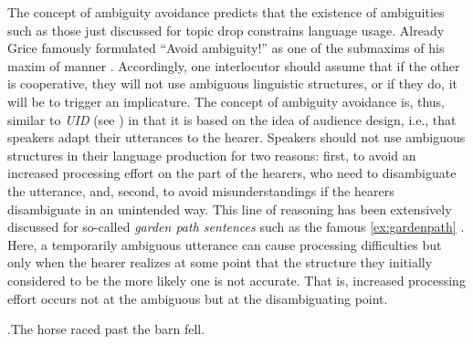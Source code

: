 The concept of ambiguity avoidance predicts that the existence of ambiguities  such as those just discussed for topic drop constrains language usage.
Already Grice famously formulated ``Avoid ambiguity!'' as one of the submaxims of his maxim of manner \citep[46]{grice1975}.
Accordingly, one interlocutor should assume that if the other is cooperative, they will not use ambiguous linguistic structures, or if they do, it will be to trigger an implicature.
The concept of ambiguity avoidance is, thus, similar to \textit{UID} (see ) in that it is based on the idea of audience design, i.e., that speakers adapt their utterances to the hearer.
Speakers should not use ambiguous structures in their language production for two reasons:  
first, to avoid an increased processing effort  on the part of the hearers, who need to disambiguate the utterance, and, second, to avoid misunderstandings if the hearers disambiguate in an unintended way.
This line of reasoning has been extensively discussed for so-called \textit{garden path sentences} such as the famous \ref{ex:gardenpath} \citep[see, e.g.,][]{sanz.etal2013}.
Here, a temporarily ambiguous utterance can cause processing difficulties  but only when the hearer realizes at some point that the structure they initially considered to be the more likely one is not accurate.
That is, increased processing effort occurs not at the ambiguous but at the disambiguating point.

\ex.\label{ex:gardenpath}The horse raced past the barn fell. \citep[316]{bever1970}

